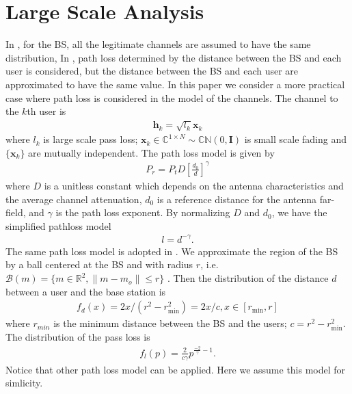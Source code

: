 \documentclass[12pt,journal,draftclsnofoot,onecolumn]{IEEEtran}
\begin{document}
\section{Large Scale Analysis}
In \cite{geraci2012secrecy}, for the BS, all the legitimate channels are assumed to have the same distribution, In \cite{geraci2014physical}, path loss determined by the distance between the BS and each user is considered, but the distance between the BS and each user are approximated to have the same value.  In this paper we consider a more practical case where path loss is considered in the model of the channels.
The channel to the $k$th user is
\begin{eqnarray}
\mathbf{h}_k = \sqrt{l_k}\mathbf{x}_k
\end{eqnarray}
where $l_k$ is large scale pass loss; $\mathbf{x}_k \in \mathbb{C}^{1 \times N} \sim \mathbb{CN}(0,\mathbf{I})$ is small scale fading and $\{\mathbf{x}_k\}$ are mutually independent. 
The path loss model is given by
\begin{eqnarray}
P_r = P_tD\left[\frac{d_0}{d}\right]^{\gamma}
\end{eqnarray}
where $D$ is a unitless constant which depends on the antenna characteristics and the average
channel attenuation, $d_0$ is a reference distance for the antenna far-field, and $\gamma$ is the path loss exponent.
By normalizing $D$ and $d_0$, we have the simplified pathloss model
\begin{eqnarray}
l = d^{-\gamma}.
\end{eqnarray}
The same path loss model is adopted in \cite{geraci2014physical}.
We approximate the region
of the BS by a ball centered at the BS and with radius $r$, i.e. $\mathcal{B}(m) =
\{m \in \mathbb{R}^2, \|m-m_o\| \leq r\}$ \cite{geraci2014physical}. Then the distribution of the distance $d$ between a user and the base station is 
\begin{eqnarray}
f_d(x) = 2x/(r^2 -r_{\mathrm{min}}^2) = 2x/c, x \in [r_{\mathrm{min}}, r]
\end{eqnarray}
where $r_{min}$ is the minimum distance between the BS and the users; $c = r^2 -r_{\mathrm{min}}^2$. The distribution of the pass loss is 
\begin{eqnarray} \label{eq:pdf_path_loss}
f_l(p) = \frac{2}{c\gamma}p^{\frac{-2}{\gamma} -1}.
\end{eqnarray}
Notice that other path loss model can be applied. Here we assume this model for simlicity.

\end{document}
